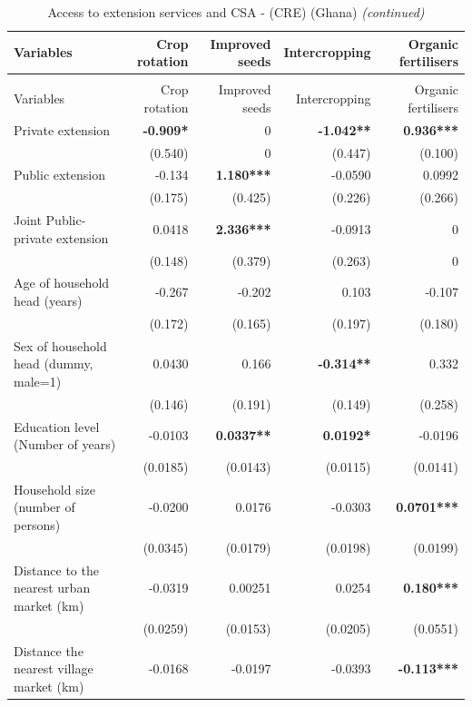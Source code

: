 \documentclass[
]{article}
\begin{document}
\newpage

\begingroup\fontsize{7}{9}\selectfont

\begin{longtable}[t]{lrrrr}
\caption{\label{tab:unnamed-chunk-5}Access to extension services and CSA - (CRE) (Ghana)}\\
\toprule
Variables & Crop rotation & Improved seeds & Intercropping & Organic fertilisers\\
\midrule
\endfirsthead
\caption[]{\label{tab:unnamed-chunk-5}Access to extension services and CSA - (CRE) (Ghana) \textit{(continued)}}\\
\toprule
Variables & Crop rotation & Improved seeds & Intercropping & Organic fertilisers\\
\midrule
\endhead

\endfoot
\bottomrule
\endlastfoot
Private extension & \textbf{-0.909*} & 0 & \textbf{-1.042**} & \textbf{0.936***}\\
 & (0.540) & 0 & (0.447) & (0.100)\\
Public extension & -0.134 & \textbf{1.180***} & -0.0590 & 0.0992\\
 & (0.175) & (0.425) & (0.226) & (0.266)\\
Joint Public-private extension & 0.0418 & \textbf{2.336***} & -0.0913 & 0\\
 & (0.148) & (0.379) & (0.263) & 0\\
Age of household head (years) & -0.267 & -0.202 & 0.103 & -0.107\\
 & (0.172) & (0.165) & (0.197) & (0.180)\\
Sex of household head (dummy, male=1) & 0.0430 & 0.166 & \textbf{-0.314**} & 0.332\\
 & (0.146) & (0.191) & (0.149) & (0.258)\\
Education level (Number of years) & -0.0103 & \textbf{0.0337**} & \textbf{0.0192*} & -0.0196\\
 & (0.0185) & (0.0143) & (0.0115) & (0.0141)\\
Household size (number of persons) & -0.0200 & 0.0176 & -0.0303 & \textbf{0.0701***}\\
 & (0.0345) & (0.0179) & (0.0198) & (0.0199)\\
Distance to the nearest urban market (km) & -0.0319 & 0.00251 & 0.0254 & \textbf{0.180***}\\
 & (0.0259) & (0.0153) & (0.0205) & (0.0551)\\
Distance the nearest village market (km) & -0.0168 & -0.0197 & -0.0393 & \textbf{-0.113***}\\

\end{longtable}
\end{document}
